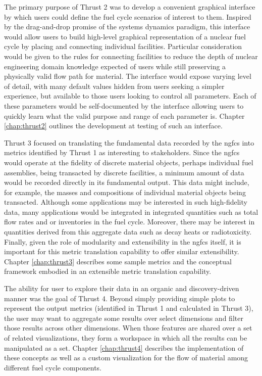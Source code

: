 The primary purpose of Thrust 2 was to develop a convenient graphical
interface by which users could define the fuel cycle scenarios of interest to
them.  Inspired by the drag-and-drop promise of the systems dynamics paradigm,
this interface would allow users to build high-level graphical representation
of a nuclear fuel cycle by placing and connecting individual facilities.
Particular consideration would be given to the rules for connecting facilities
to reduce the depth of nuclear engineering domain knowledge expected of users
while still preserving a physically valid flow path for material.  The
interface would expose varying level of detail, with many default values
hidden from users seeking a simpler experience, but available to those users
looking to control all parameters.  Each of these parameters would be
self-documented by the interface allowing users to quickly learn what the
valid purpose and range of each parameter is. Chapter \ref{chap:thrust2}
outlines the development at testing of such an interface.

Thrust 3 focused on translating the fundamental data recorded by the
\gls{ngfcs} into metrics identified by Thrust 1 as interesting to
stakeholders.  Since the \gls{ngfcs} would operate at the fidelity of discrete
material objects, perhaps individual fuel assemblies, being transacted by
discrete facilities, a minimum amount of data would be recorded directly in
its fundamental output.  This data might include, for example, the masses and
compositions of individual material objects being transacted.  Although some
applications may be interested in such high-fidelity data, many applications
would be integrated in integrated quantities such as total flow rates and or
inventories in the fuel cycle.  Moreover, there may be interest in quantities
derived from this aggregate data such as decay heats or radiotoxicity.
Finally, given the role of modularity and extensibility in the \gls{ngfcs}
itself, it is important for this metric translation capability to offer
similar extensibility.  Chapter \ref{chap:thrust3} describes some sample
metrics and the conceptual framework embodied in an extensible metric
translation capability.

The ability for user to explore their data in an organic and discovery-driven
manner was the goal of Thrust 4.  Beyond simply providing simple plots to
represent the output metrics (identified in Thrust 1 and calculated in Thrust
3), the user may want to aggregate some results over select dimensions and
filter those results across other dimensions.  When those features are shared
over a set of related visualizations, they form a workspace in which all the
results can be manipulated as a set.  Chapter \ref{chap:thrust4} describes the
implementation of these concepts as well as a custom visualization for the
flow of material among different fuel cycle components.

